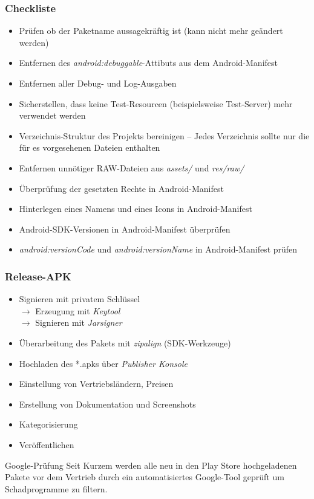 \begin{frame}
	\frametitle{Checkliste}
	\begin{itemize}
		\item Prüfen ob der Paketname aussagekräftig ist (kann nicht mehr geändert werden)
		\item Entfernen des \emph{android:debuggable}-Attibuts aus dem Android-Manifest
		\item Entfernen aller Debug- und Log-Ausgaben
		\item Sicherstellen, dass keine Test-Resourcen (beispielsweise Test-Server) 
			mehr verwendet werden
		\item Verzeichnis-Struktur des Projekts bereinigen -- Jedes Verzeichnis sollte nur die 
			für es vorgesehenen Dateien enthalten
		\item Entfernen unnötiger RAW-Dateien aus \emph{assets/} und \emph{res/raw/}
		\item Überprüfung der gesetzten Rechte in Android-Manifest
		\item Hinterlegen eines Namens und eines Icons in Android-Manifest
		\item Android-SDK-Versionen in Android-Manifest überprüfen
		\item \emph{android:versionCode} und \emph{android:versionName} in Android-Manifest prüfen
	\end{itemize}
\end{frame}

\begin{frame}
	\frametitle{Release-APK}
	\begin{itemize}
		\item Signieren mit privatem Schlüssel\\
			$\rightarrow$ Erzeugung mit \emph{Keytool}\\
			$\rightarrow$ Signieren mit \emph{Jarsigner}
		\item Überarbeitung des Pakets mit \emph{zipalign} (SDK-Werkzeuge)
		\item Hochladen des *.apks über \emph{Publisher Konsole}
		\item Einstellung von Vertriebsländern, Preisen
		\item Erstellung von Dokumentation und Screenshots
		\item Kategorisierung
		\item Veröffentlichen
	\end{itemize}
	
	\begin{alertblock}{Google-Prüfung}
		Seit Kurzem werden alle neu in den Play Store hochgeladenen Pakete vor dem 
		Vertrieb durch ein automatisiertes Google-Tool geprüft um 
		Schadprogramme zu filtern.
	\end{alertblock}
\end{frame}
